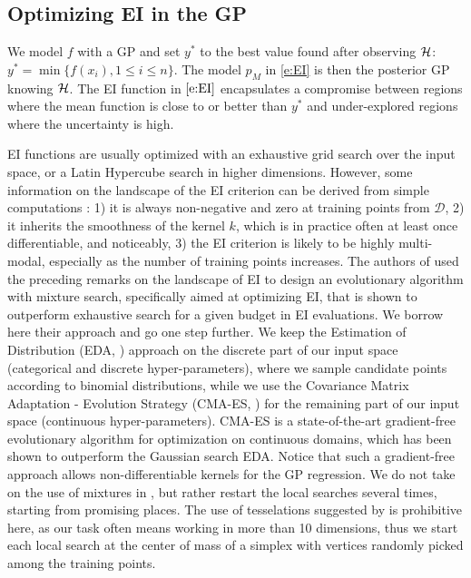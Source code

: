 \documentclass{article}
\newcommand{\vs}[1]{\vspace*{-#1mm}}
\newcommand{\Bss}{\vs{1}}
\newcommand{\ass}{\vs{0.7}}
\begin{document}
\Bss
\subsection{Optimizing EI in the GP}
\ass
\label{ss:ea}

We model $f$ with a GP and set $y^*$ to the best value found
after observing ${\cal H}$: $y^*=\min\{
f(x_i),1\leq i\leq n\}$. The model $p_M$ in \eqref{e:EI} is then the
posterior GP knowing ${\cal H}$. The EI function in $\eqref{e:EI}$
encapsulates a compromise between
regions where the mean function is
close to or better than $y^*$ and
under-explored regions where the uncertainty is high.

EI functions are usually optimized with an exhaustive grid search
over the input space, or a Latin Hypercube search in
higher dimensions. However, some information on the landscape of the
EI criterion can be derived from simple computations \cite{BaKe10}: 1) it is
always non-negative and zero at training points from $\mathcal{D}$, 2) it
inherits the smoothness of the kernel $k$, which is
in practice often at least once differentiable, and noticeably, 3) the
EI criterion is likely to be highly multi-modal, especially as the number of
training points increases. The authors of \cite{BaKe10} used the
preceding remarks on the landscape of EI to design an evolutionary
algorithm with mixture search, specifically aimed at optimizing EI,
that is shown to outperform exhaustive search for a given budget in EI
evaluations. We borrow here their approach and go one step further. We keep the
Estimation of Distribution (EDA, \cite{LaLo01}) approach on the discrete
part of our input space (categorical and
discrete hyper-parameters), where we sample candidate points according
to binomial distributions, while we use the Covariance Matrix Adaptation -
Evolution Strategy (CMA-ES, \cite{Han06}) for the remaining part of
our input space (continuous hyper-parameters). CMA-ES is a
state-of-the-art gradient-free evolutionary algorithm for optimization on continuous
domains, which has been shown to outperform the Gaussian search
EDA. Notice that such a gradient-free approach allows
non-differentiable kernels for the GP regression. We do not take on the use
of mixtures in \cite{BaKe10}, but rather restart the local searches
several times, starting from promising places. The use of tesselations
suggested by \cite{BaKe10} is prohibitive here, as our task often means
working in more than 10 dimensions, thus we start each local search at
the center of mass of a simplex with vertices randomly picked among the training points.
\end{document}
